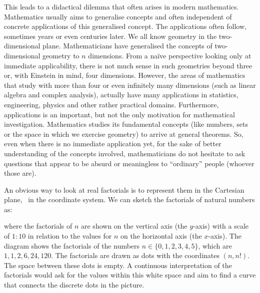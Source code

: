 \documentclass[tikz]{scrreprt}
\begin{document}
This leads to a didactical dilemma 
that often arises in modern mathematics. 
Mathematics usually aims to generalise concepts
and often independent of concrete applications
of this generalised concept.
The applications often follow, sometimes years
or even centuries later.
We all know geometry in the two-dimensional plane.
Mathematicians have generalised the concepts of
two-dimensional geometry to $n$ dimensions.
From a na\"ive perspective looking 
only at immediate applicability,
there is not much sense
in such geometries beyond three or,
with Einstein in mind, four dimensions.
However, the areas of mathematics that study
 with more than four or even
infinitely many dimensions (such as linear algebra
and complex analysis), actually have many applications in
statistics, engineering, physics and other
rather practical domains.
Furthermore, applications is an important, but not
the only motivation for mathematical investigation.
Mathematics studies its fundamental concepts
(like numbers, sets or the space in which we
exercise geometry) to arrive at general theorems.
So, even when there is no immediate application yet,
for the sake of better understanding of the concepts involved,
mathematicians do not hesitate to ask questions
that appear to be absurd or meaningless to ``ordinary'' people
(whoever those are).

An obvious way to look at real factorials is to represent them
in the Cartesian plane, \ie\ in the coordinate system.
We can sketch the factorials of natural numbers as:

\begin{center}
\end{center}

where the factorials of $n$ are shown 
on the vertical axis (the $y$-axis)
with a scale of $1:10$ in relation to the values for $n$ 
on the horizontal axis (the $x$-axis).
The diagram shows the factorials 
of the numbers $n\in\lbrace 0, 1, 2, 3, 4, 5\rbrace$,
which are $1, 1, 2, 6, 24, 120$.
The factorials are drawn as dots with the coordinates
$(n,n!)$. The space between these dots is empty.
A continuous interpretation of the factorials would ask for the
values within this white space and aim to find a curve
that connects the discrete dots in the picture.
\end{document}
